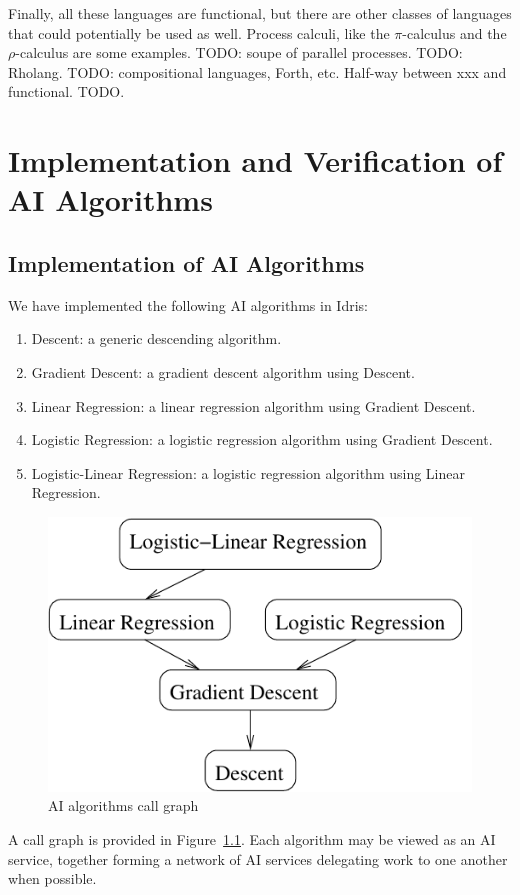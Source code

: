 \documentclass[]{report}
\begin{document}
Finally, all these languages are functional, but there are other
classes of languages that could potentially be used as well.  Process
calculi, like the $\pi$-calculus and the $\rho$-calculus are some
examples.  TODO: soupe of parallel processes.  TODO: Rholang.  TODO:
compositional languages, Forth, etc.  Half-way between xxx and
functional.  TODO.

\chapter{Implementation and Verification of AI Algorithms}

\section{Implementation of AI Algorithms}
We have implemented the following AI algorithms in Idris:
\begin{enumerate}
\item Descent: a generic descending algorithm.
\item Gradient Descent: a gradient descent algorithm using Descent.
\item Linear Regression: a linear regression algorithm using Gradient
  Descent.
\item Logistic Regression: a logistic regression algorithm using
  Gradient Descent.
\item Logistic-Linear Regression: a logistic regression algorithm
  using Linear Regression.
\end{enumerate}
\begin{figure}[H]
  \centering
  \includegraphics[scale=0.8]{figs/ai-algorithms.xfig.pdf}
  \caption{AI algorithms call graph}
  \label{fig:ai_algorithms}
\end{figure}
A call graph is provided in Figure~\ref{fig:ai_algorithms}.  Each
algorithm may be viewed as an AI service, together forming a network
of AI services delegating work to one another when possible.
\end{document}
